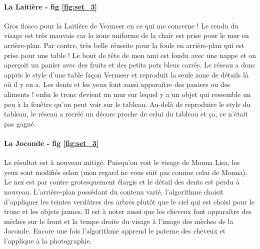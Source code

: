 \documentclass{article}
\begin{document}
\paragraph*{La Laitière - fig \ref{fig:set_3}} Gros fiasco pour la Laitière de Vermeer en ce qui me concerne ! Le rendu du visage est très mauvais car la zone uniforme de la chair est prise pour le mur en arrière-plan. Par contre, très belle réussite pour la foule en arrière-plan qui est prise pour une table ! Le bout de tête de mon ami est fondu avec une nappe et on aperçoit un panier avec des fruits et des petits pots bleus carrés. Le réseau a donc appris le style d'une table façon Vermeer et reproduit la seule zone de détails là où il y en a. Les dents et les yeux font aussi apparaître des paniers ou des aliments ! enfin le tronc devient un mur  sur lequel y a un objet qui ressemble un peu à la fenêtre qu'on peut voir sur le tableau. Au-delà de reproduire le style du tableau, le réseau a recréé un décors proche de celui du tableau et ça, ce n'était pas gagné.

\paragraph*{La Joconde - fig \ref{fig:set_3}} Le résultat est à nouveau mitigé. Puisqu'on voit le visage de Monna Lisa, les yeux sont modifiés selon (mon regard ne vous suit pas comme celui de Monna). Le nez est par contre grotesquement élargis et le détail des dents est perdu à nouveau. L'arrière-plan possédant du contenu varié, l'algorithme choisit d'appliquer les teintes verdâtres des arbres plutôt que le ciel qui est choisi pour le tronc et les objets jaunes. Il est à noter aussi que les cheveux font apparaître des mèches sur le front et la tempe droite du visage à l'image des mèches de la Joconde. Encore une fois l'algorithme apprend le paterne des cheveux et l'applique à la photographie.
\end{document}

